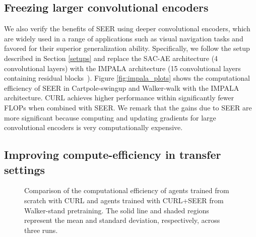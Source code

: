 \documentclass{article}
\begin{document}
\subsection{Freezing larger convolutional encoders} \label{impala}

We also verify the benefits of SEER using deeper convolutional encoders, which are widely used in a range of applications such as visual navigation tasks and favored for their superior generalization ability.
Specifically, 
we follow the setup described in Section \ref{setups} and replace the SAC-AE architecture (4 convolutional layers) with the IMPALA architecture \citep{espeholt2018impala} (15 convolutional layers containing residual blocks~\citep{he2016deep}).
Figure \ref{fig:impala_plots} shows the computational efficiency of SEER in Cartpole-swingup and Walker-walk with the IMPALA architecture. CURL achieves higher performance within significantly fewer FLOPs when combined with SEER.
We remark that the gains due to SEER are more significant because computing and updating gradients for large convolutional encoders is very computationally expensive.


\subsection{Improving compute-efficiency in transfer settings}

\begin{wrapfigure}{r}{0.48\textwidth} \centering
\vspace{-10mm}
\caption{Comparison of the computational efficiency of agents trained from scratch with CURL and agents trained with CURL+SEER from Walker-stand pretraining. The solid line and shaded regions represent the mean and standard deviation, respectively, across three runs.}
\vspace{-0.2in}
\end{wrapfigure}
\end{document}
